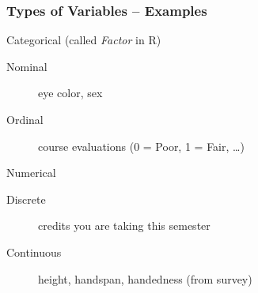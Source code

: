 
\begin{frame}
\frametitle{Types of Variables -- Examples}
\begin{block}{Categorical (called \emph{Factor} in R)}
		\begin{description}
			\item[Nominal] eye color, sex
			\item[Ordinal] course evaluations (0 = Poor, 1 = Fair, \dots)
		\end{description}
\end{block}

\begin{block}{Numerical}
		\begin{description}
			\item[Discrete] credits you are taking this semester 
      \item[Continuous] height, handspan, handedness (from survey) 
		\end{description}
\end{block}

\end{frame}


%


